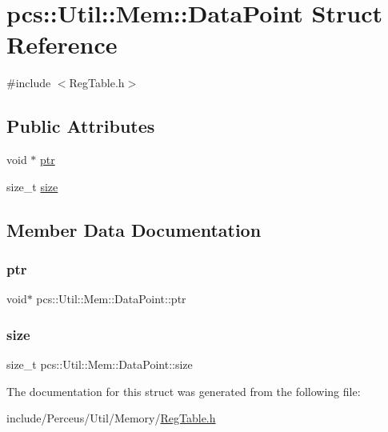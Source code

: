 \hypertarget{structpcs_1_1Util_1_1Mem_1_1DataPoint}{}\section{pcs\+:\+:Util\+:\+:Mem\+:\+:Data\+Point Struct Reference}
\label{structpcs_1_1Util_1_1Mem_1_1DataPoint}


{\ttfamily \#include $<$Reg\+Table.\+h$>$}

\subsection*{Public Attributes}
\begin{DoxyCompactItemize}
\item 
void $\ast$ \hyperlink{structpcs_1_1Util_1_1Mem_1_1DataPoint_af948a77a4da0a6600f0a614f63a4f91c}{ptr}
\item 
size\+\_\+t \hyperlink{structpcs_1_1Util_1_1Mem_1_1DataPoint_aad68b9e985613c4fbc41e4861d8dbfa7}{size}
\end{DoxyCompactItemize}


\subsection{Member Data Documentation}
\mbox{\label{structpcs_1_1Util_1_1Mem_1_1DataPoint_af948a77a4da0a6600f0a614f63a4f91c}} 
\subsubsection{\texorpdfstring{ptr}{ptr}}
{\footnotesize\ttfamily void$\ast$ pcs\+::\+Util\+::\+Mem\+::\+Data\+Point\+::ptr}

\mbox{\label{structpcs_1_1Util_1_1Mem_1_1DataPoint_aad68b9e985613c4fbc41e4861d8dbfa7}} 
\subsubsection{\texorpdfstring{size}{size}}
{\footnotesize\ttfamily size\+\_\+t pcs\+::\+Util\+::\+Mem\+::\+Data\+Point\+::size}



The documentation for this struct was generated from the following file\+:\begin{DoxyCompactItemize}
\item 
include/\+Perceus/\+Util/\+Memory/\hyperlink{RegTable_8h}{Reg\+Table.\+h}\end{DoxyCompactItemize}
